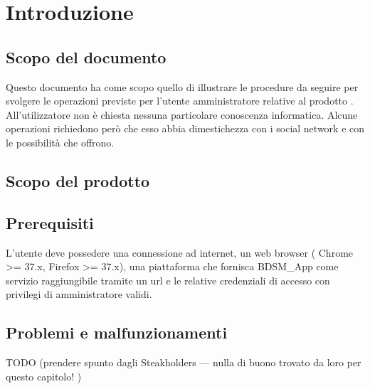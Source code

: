 %


\section{Introduzione} %
\label{sec:introduzione}
	\subsection{Scopo del documento} %
	\label{sub:scopo_del_documento}
	Questo documento ha come scopo quello di illustrare le procedure da seguire per svolgere le operazioni previste per l'utente amministratore relative al prodotto \projectName. All'utilizzatore non è chiesta nessuna particolare conoscenza informatica. Alcune operazioni richiedono però che esso abbia dimestichezza con i social network e con le possibilità che offrono.

	\subsection{Scopo del prodotto} %
	\label{sub:scopo_del_prodotto}
	\productScope

	\subsection{Prerequisiti} %
	\label{sub:prerequisiti}
	L’utente deve possedere una connessione ad internet, un web browser ( Chrome >= 37.x, Firefox >= 37.x), una piattaforma che fornisca BDSM\_App come servizio raggiungibile tramite un url e le relative credenziali di accesso con privilegi di amministratore validi.

	\subsection{Problemi e malfunzionamenti} %
	\label{sub:problemi_e_malfunzionamenti}
	TODO (prendere spunto dagli Steakholders --- nulla di buono trovato da loro per questo capitolo! )


